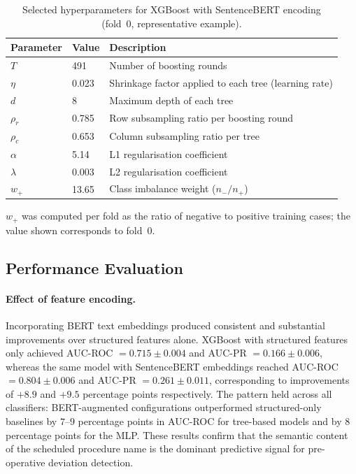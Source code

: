 \begin{table}[ht]
\centering
\begin{threeparttable}
\caption{Selected hyperparameters for XGBoost with SentenceBERT encoding
         (fold~0, representative example).}
\label{tab:hyperparams}
\begin{tabular}{llp{7cm}}
\toprule
Parameter & Value & Description \\
\midrule
$T$            & 491   & Number of boosting rounds \\
$\eta$         & 0.023 & Shrinkage factor applied to each tree (learning rate) \\
$d$            & 8     & Maximum depth of each tree \\
$\rho_{r}$     & 0.785 & Row subsampling ratio per boosting round \\
$\rho_{c}$     & 0.653 & Column subsampling ratio per tree \\
$\alpha$       & 5.14  & L1 regularisation coefficient \\
$\lambda$      & 0.003 & L2 regularisation coefficient \\
$w_{+}$        & 13.65 & Class imbalance weight ($n_{-}/n_{+}$) \\
\bottomrule
\end{tabular}
\begin{tablenotes}
  \footnotesize
  \item $w_{+}$ was computed per fold as the ratio of negative to positive
        training cases; the value shown corresponds to fold~0.
\end{tablenotes}
\end{threeparttable}
\end{table}

\subsection{Performance Evaluation}
\label{sec:performance}

\paragraph{Effect of feature encoding.}
Incorporating BERT text embeddings produced consistent and substantial
improvements over structured features alone.  XGBoost with structured features only achieved AUC-ROC $= 0.715 \pm 0.004$
and AUC-PR $= 0.166 \pm 0.006$, whereas the same model with SentenceBERT
embeddings reached AUC-ROC $= 0.804 \pm 0.006$ and AUC-PR $= 0.261 \pm
0.011$, corresponding to improvements of $+8.9$ and $+9.5$ percentage points
respectively.  The pattern held across all classifiers: BERT-augmented
configurations outperformed structured-only baselines by $7$--$9$ percentage
points in AUC-ROC for tree-based models and by $8$ percentage points for the
MLP.  These results confirm that the semantic content of the scheduled
procedure name is the dominant predictive signal for pre-operative deviation
detection.

